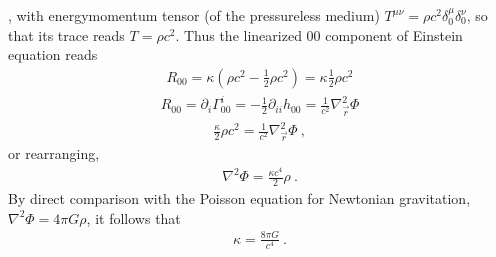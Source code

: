 \documentclass[letterpaper,10pt,english]{jupyterBook}
\begin{document}
\sphinxAtStartPar
{}, with energy\sphinxhyphen{}momentum tensor (of the pressure\sphinxhyphen{}less medium) \(T^{\mu \nu} = \rho c^2 \delta^{\mu}_0 \delta^{\nu}_0\), so that its trace reads \(T = \rho c^2\). Thus the linearized \(00\) component of Einstein equation reads
\begin{equation*}
\begin{split}R_{00} = \kappa \left( \rho c^2 - \frac{1}{2} \rho c^2 \right) = \kappa \frac{1}{2} \rho c^2\end{split}
\end{equation*}
\sphinxAtStartPar
{}
\begin{equation*}
\begin{split}R_{00} = \partial_i \Gamma^{i}_{00} = - \frac{1}{2} \partial_{ii} h_{00} = \frac{1}{c^2} \nabla^2_{\vec{r}} \Phi\end{split}
\end{equation*}
\sphinxAtStartPar
{}
\begin{equation*}
\begin{split}\frac{\kappa}{2} \rho c^2 = \frac{1}{c^2} \nabla^2_{\vec{r}} \Phi \ , \end{split}
\end{equation*}
\sphinxAtStartPar
or rearranging,
\begin{equation*}
\begin{split}\nabla^2 \Phi = \frac{\kappa c^4}{2} \rho \ .\end{split}
\end{equation*}
\sphinxAtStartPar
By direct comparison with the Poisson equation for Newtonian gravitation, \(\nabla^2 \Phi = 4 \pi G \rho\), it follows that
\begin{equation*}
\begin{split}\kappa = \frac{8 \pi G}{c^4} \ .\end{split}
\end{equation*}
\sphinxstepscope
\end{document}
